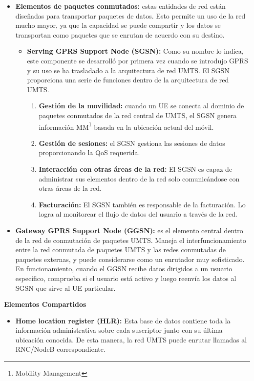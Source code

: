 \begin{itemize}
\begin{itemize}
\begin{itemize}
		\item \textbf{Elementos de paquetes conmutados:} estas entidades de red están diseñadas para transportar paquetes de datos. Esto permite un uso de la red mucho mayor, ya que la capacidad se puede compartir y los datos se transportan como paquetes que se enrutan de acuerdo con su destino. \\
		\begin{itemize}
		\item \textbf{Serving GPRS Support Node (SGSN):} Como su nombre lo indica, este componente se desarrolló por primera vez cuando se introdujo GPRS y su uso se ha trasladado a la arquitectura de red UMTS. El SGSN proporciona una serie de funciones dentro de la arquitectura de red UMTS. \\
		\begin{enumerate}
		\item \textbf{Gestión de la movilidad:} cuando un UE se conecta al dominio de paquetes conmutados de la red central de UMTS, el SGSN genera información MM\footnote{Mobility Management} basada en la ubicación actual del móvil.
		\item \textbf{Gestión de sesiones:} el SGSN gestiona las sesiones de datos proporcionando la QoS requerida.
		\item \textbf{Interacción con otras áreas de la red:} El SGSN es capaz de administrar sus elementos dentro de la red solo comunicándose con otras áreas de la red.
		\item \textbf{Facturación:} El SGSN también es responsable de la facturación. Lo logra al monitorear el flujo de datos del usuario a través de la red.
		\end{enumerate}
		\end{itemize}
		\item \textbf{Gateway GPRS Support Node (GGSN):} es el elemento central dentro de la red de conmutación de paquetes UMTS. Maneja el interfuncionamiento entre la red conmutada de paquetes UMTS y las redes conmutadas de paquetes externas, y puede considerarse como un enrutador muy sofisticado. En funcionamiento, cuando el GGSN recibe datos dirigidos a un usuario específico, comprueba si el usuario está activo y luego reenvía los datos al SGSN que sirve al UE particular.
		\end{itemize}
	\end{itemize}
	\textbf{Elementos Compartidos}
	\begin{itemize}
	\item \textbf{Home location register (HLR):} Esta base de datos contiene toda la información administrativa sobre cada suscriptor junto con su última ubicación conocida. De esta manera, la red UMTS puede enrutar llamadas al RNC/NodeB correspondiente.

\end{itemize}
\end{itemize}
